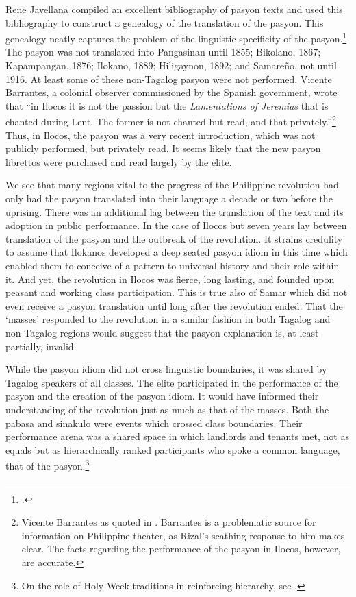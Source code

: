 Rene Javellana compiled an excellent bibliography of pasyon texts and used this bibliography to construct a genealogy of the translation of the pasyon. This genealogy neatly captures the problem of the linguistic specificity of the pasyon.\footcite{Javellana1983} The pasyon was not translated into Pangasinan until 1855; Bikolano, 1867; Kapampangan, 1876; Ilokano, 1889; Hiligaynon, 1892; and Samare\~no, not until 1916. At least some of these non-Tagalog pasyon were not performed. Vicente Barrantes, a colonial observer commissioned by the Spanish government, wrote that \enquote{in Ilocos it is not the passion but the \textit{Lamentations of Jeremias} that is chanted during Lent. The former is not chanted but read, and that privately.}\footnote{Vicente Barrantes as quoted in \cite[165]{DelaCosta1965}. Barrantes is a problematic source for information on Philippine theater, as Rizal’s scathing response to him makes clear. The facts regarding the performance of the pasyon in Ilocos, however, are accurate.}  Thus, in Ilocos, the pasyon was a very recent introduction, which was not publicly performed, but privately read. It seems likely that the new pasyon librettos were purchased and read largely by the elite. 

We see that many regions vital to the progress of the Philippine revolution had only had the pasyon translated into their language a decade or two before the uprising. There was an additional lag between the translation of the text and its adoption in public performance. In the case of Ilocos but seven years lay between translation of the pasyon and the outbreak of the revolution. It strains credulity to assume that Ilokanos developed a deep seated pasyon idiom in this time which enabled them to conceive of a pattern to universal history and their role within it. And yet, the revolution in Ilocos was fierce, long lasting, and founded upon peasant and working class participation. This is true also of Samar which did not even receive a pasyon translation until long after the revolution ended. That the \enquote*{masses} responded to the revolution in a similar fashion in both Tagalog and non-Tagalog regions would suggest that the pasyon explanation is, at least partially, invalid. 

While the pasyon idiom did not cross linguistic boundaries, it was shared by Tagalog speakers of all classes. The elite participated in the performance of the pasyon and the creation of the pasyon idiom. It would have informed their understanding of the revolution just as much as that of the masses. Both the pabasa and sinakulo were events which crossed class boundaries. Their performance arena was a shared space in which landlords and tenants met, not as equals but as hierarchically ranked participants who spoke a common language, that of the pasyon.\footnote{On the role of Holy Week traditions in reinforcing hierarchy, see \cite{Venida1996}.}

